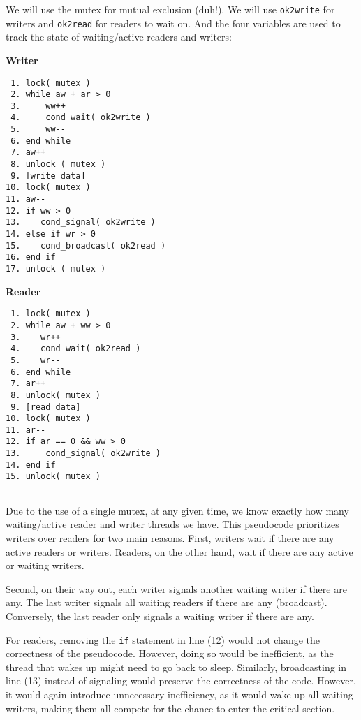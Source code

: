 We will use the mutex for mutual exclusion (duh!).
We will use \texttt{ok2write} for writers and \texttt{ok2read} for readers to wait on.
And the four variables are used to track the state of waiting/active readers and writers:

\begin{multicols}{2}
    \textbf{Writer}\vspace{-2em}
    \begin{verbatim}
 1. lock( mutex )
 2. while aw + ar > 0
 3.     ww++
 4.     cond_wait( ok2write )
 5.     ww--
 6. end while
 7. aw++
 8. unlock ( mutex )
 9. [write data]
10. lock( mutex )
11. aw--
12. if ww > 0
13.    cond_signal( ok2write )
14. else if wr > 0
15.    cond_broadcast( ok2read )
16. end if
17. unlock ( mutex )
    \end{verbatim}
    \columnbreak
    \textbf{Reader}\vspace{-2em}
    \begin{verbatim}
 1. lock( mutex )
 2. while aw + ww > 0
 3.    wr++
 4.    cond_wait( ok2read )
 5.    wr--
 6. end while
 7. ar++
 8. unlock( mutex )
 9. [read data]
10. lock( mutex )
11. ar--
12. if ar == 0 && ww > 0
13.     cond_signal( ok2write )
14. end if
15. unlock( mutex )


    \end{verbatim}
\end{multicols}
\vspace{-2em}


Due to the use of a single mutex, at any given time, we know exactly how many waiting/active reader and writer threads we have.
This pseudocode prioritizes writers over readers for two main reasons.
First, writers wait if there are any active readers or writers.
Readers, on the other hand, wait if there are any active or waiting writers.

Second, on their way out, each writer signals another waiting writer if there are any.
The last writer signals all waiting readers if there are any (broadcast).
Conversely, the last reader only signals a waiting writer if there are any.

For readers, removing the \texttt{if} statement in line (12) would not change the correctness of the pseudocode.
However, doing so would be inefficient, as the thread that wakes up might need to go back to sleep.
Similarly, broadcasting in line (13) instead of signaling would preserve the correctness of the code.
However, it would again introduce unnecessary inefficiency, as it would wake up all waiting writers, making them all compete for the chance to enter the critical section.

